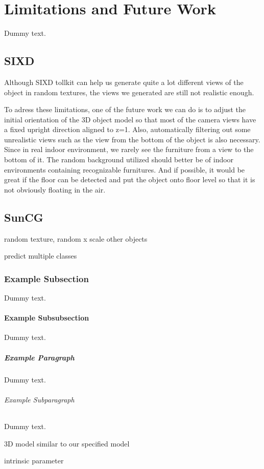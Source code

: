 \chapter{Limitations and Future Work}

Dummy text.

\section{SIXD}
\label{sec:SIXD}
Although SIXD tollkit can help us generate quite a lot different views of the object in random textures, the views we generated are still not realistic enough.

To adress these limitations, one of the future work we can do is to adjust the initial orientation of the 3D object model so that most of the camera views have a fixed upright direction aligned to z=1. Also, automatically filtering out some unrealistic views such as the view from the bottom of the object is also necessary. Since in real indoor environment, we rarely see the furniture from a view to the bottom of it. The random background utilized should better be of indoor environments containing recognizable furnitures. And if possible, it would be great if the floor can be detected and put the object onto floor level so that it is not obviously floating in the air.

\section{SunCG}
random texture, random x scale
other objects

predict multiple classes

\subsection{Example Subsection}

Dummy text.

\subsubsection{Example Subsubsection}

Dummy text.

\paragraph{Example Paragraph}

Dummy text.

\subparagraph{Example Subparagraph}

Dummy text.


3D model similar to our specified model

 intrinsic parameter